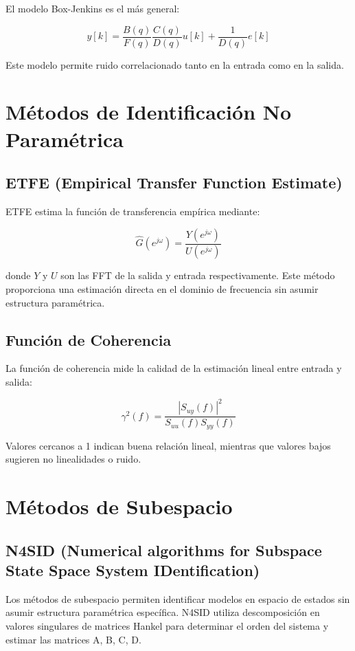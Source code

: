 \documentclass[a4paper,openright,9pt]{report}
\begin{document}
El modelo Box-Jenkins es el más general:

\[
y[k] = \frac{B(q)}{F(q)} \frac{C(q)}{D(q)} u[k] + \frac{1}{D(q)} e[k]
\]

Este modelo permite ruido correlacionado tanto en la entrada como en la salida.

\section{Métodos de Identificación No Paramétrica}

\subsection{ETFE (Empirical Transfer Function Estimate)}

ETFE estima la función de transferencia empírica mediante:

\[
\hat{G}(e^{j\omega}) = \frac{Y(e^{j\omega})}{U(e^{j\omega})}
\]

donde $Y$ y $U$ son las FFT de la salida y entrada respectivamente. Este método proporciona una estimación directa en el dominio de frecuencia sin asumir estructura paramétrica.

\subsection{Función de Coherencia}

La función de coherencia mide la calidad de la estimación lineal entre entrada y salida:

\[
\gamma^2(f) = \frac{|S_{uy}(f)|^2}{S_{uu}(f) S_{yy}(f)}
\]

Valores cercanos a 1 indican buena relación lineal, mientras que valores bajos sugieren no linealidades o ruido.

\section{Métodos de Subespacio}

\subsection{N4SID (Numerical algorithms for Subspace State Space System IDentification)}

Los métodos de subespacio permiten identificar modelos en espacio de estados sin asumir estructura paramétrica específica. N4SID utiliza descomposición en valores singulares de matrices Hankel para determinar el orden del sistema y estimar las matrices A, B, C, D.
\end{document}
